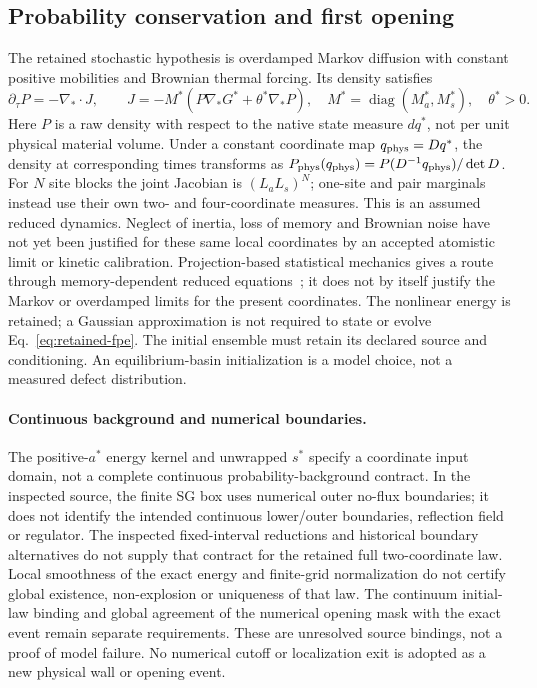 \documentclass[11pt]{article}
\begin{document}
\subsection{Probability conservation and first opening}
The retained stochastic hypothesis is overdamped Markov diffusion with constant
positive mobilities and Brownian thermal forcing. Its density satisfies
\begin{equation}
 \partial_\tau P=-\nabla_*\!\cdot J,\qquad
 J=-M^*\left(P\nabla_*G^*+\theta^*\nabla_*P\right),\quad
 M^*=\operatorname{diag}(M_a^*,M_s^*),\quad\theta^*>0.
 \label{eq:retained-fpe}
\end{equation}
Here $P$ is a raw density with respect to the native state measure $dq^*$,
not per unit physical material volume. Under a constant coordinate map
$q_{\rm phys}=Dq^*$, the density at corresponding times transforms as
$P_{\rm phys}(q_{\rm phys})=P(D^{-1}q_{\rm phys})/\det D$.
For $N$ site blocks the joint Jacobian is $(L_aL_s)^N$;
one-site and pair marginals instead use their own two- and four-coordinate measures.
This is an assumed reduced dynamics. Neglect of inertia, loss of memory and
Brownian noise have not yet been justified for these same local coordinates
by an accepted atomistic limit or kinetic calibration. Projection-based
statistical mechanics gives a route through memory-dependent reduced
equations~\cite{Mori1965}; it does not by itself justify the Markov or
overdamped limits for the present coordinates.
The nonlinear energy is retained; a Gaussian approximation is not required
to state or evolve Eq.~\eqref{eq:retained-fpe}.
The initial ensemble must retain its declared source and conditioning.
An equilibrium-basin initialization is a model choice, not a measured defect distribution.

\paragraph{Continuous background and numerical boundaries.}
The positive-$a^*$ energy kernel and unwrapped $s^*$ specify a coordinate
input domain, not a complete continuous probability-background contract.
In the inspected source, the finite SG box uses numerical outer no-flux
boundaries; it does not identify the intended continuous lower/outer
boundaries, reflection field or regulator.
The inspected fixed-interval reductions and historical boundary alternatives
do not supply that contract for the retained full two-coordinate law.
Local smoothness of the exact energy and finite-grid normalization do not
certify global existence, non-explosion or uniqueness of that law.
The continuum initial-law binding and global agreement of the numerical
opening mask with the exact event remain separate requirements.
These are unresolved source bindings, not a proof of model failure.
No numerical cutoff or localization exit is adopted as a new physical wall
or opening event.
\end{document}
